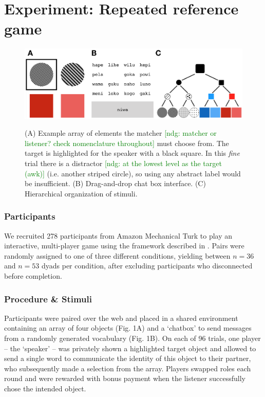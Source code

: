 \documentclass[10pt,letterpaper]{article}
\newcommand{\ndg}[1]{\textcolor{Green}{[ndg: #1]}}
\begin{document}
\section{Experiment: Repeated reference game}

\begin{figure}[t]
\begin{center}
{\includegraphics[scale=.65]{fig.png}}
{\caption{{(A) Example array of elements the matcher \ndg{matcher or listener? check nomenclature throughout} must choose from. The target is highlighted for the speaker with a black square. In this \emph{fine} trial there is a distractor \ndg{at the lowest level as the target (awk)} (i.e. another striped circle), so using any abstract label would be insufficient. (B) Drag-and-drop chat box interface. (C) Hierarchical organization of stimuli.\label{exp}}}}
\end{center}
\end{figure}

\subsubsection{Participants}

We recruited 278 participants from Amazon Mechanical Turk to play an interactive, multi-player game using the framework described in . Pairs were randomly assigned to one of three different conditions, yielding between $n=36$ and $n=53$ dyads per condition, after excluding participants who disconnected before completion.

\subsubsection{Procedure \& Stimuli}
Participants were paired over the web and placed in a shared environment containing an array of four objects (Fig. 1A) and a `chatbox' to send messages from a randomly generated vocabulary (Fig. 1B). On each of 96 trials, one player -- the `speaker' -- was privately shown a highlighted target object and allowed to send a single word to communicate the identity of this object to their partner, who subsequently made a selection from the array. Players swapped roles each round and were rewarded with bonus payment when the listener successfully chose the intended object.
\end{document}
